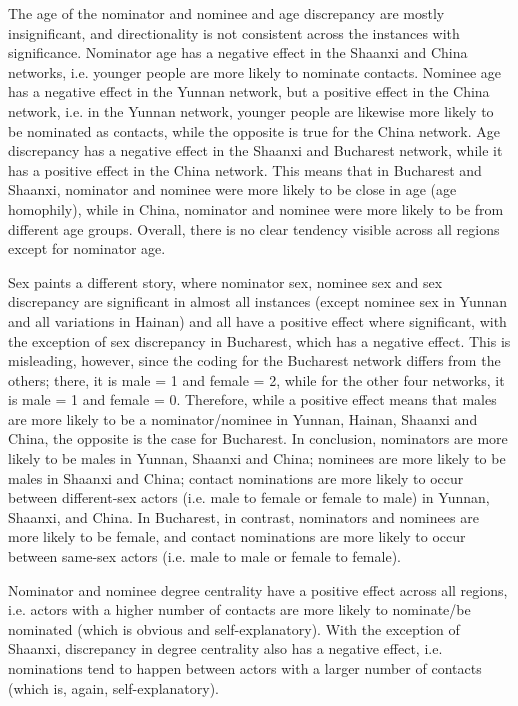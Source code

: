 The age of the nominator and nominee and age discrepancy are mostly insignificant, and directionality is not consistent across the instances with significance. Nominator age has a negative effect in the Shaanxi and China networks, i.e. younger people are more likely to nominate contacts. Nominee age has a negative effect in the Yunnan network, but a positive effect in the China network, i.e. in the Yunnan network, younger people are likewise more likely to be nominated as contacts, while the opposite is true for the China network. Age discrepancy has a negative effect in the Shaanxi and Bucharest network, while it has a positive effect in the China network. This means that in Bucharest and Shaanxi, nominator and nominee were more likely to be close in age (age homophily), while in China, nominator and nominee were more likely to be from different age groups. Overall, there is no clear tendency visible across all regions except for nominator age.

Sex paints a different story, where nominator sex, nominee sex and sex discrepancy are significant in almost all instances (except nominee sex in Yunnan and all variations in Hainan) and all have a positive effect where significant, with the exception of sex discrepancy in Bucharest, which has a negative effect. This is misleading, however, since the coding for the Bucharest network differs from the others; there, it is male = 1 and female = 2, while for the other four networks, it is male = 1 and female = 0. Therefore, while a positive effect means that males are more likely to be a nominator/nominee in Yunnan, Hainan, Shaanxi and China, the opposite is the case for Bucharest. In conclusion, nominators are more likely to be males in Yunnan, Shaanxi and China; nominees are more likely to be males in Shaanxi and China; contact nominations are more likely to occur between different-sex actors (i.e. male to female or female to male) in Yunnan, Shaanxi, and China. In Bucharest, in contrast, nominators and nominees are more likely to be female, and contact nominations are more likely to occur between same-sex actors (i.e. male to male or female to female).

Nominator and nominee degree centrality have a positive effect across all regions, i.e. actors with a higher number of contacts are more likely to nominate/be nominated (which is obvious and self-explanatory). With the exception of Shaanxi, discrepancy in degree centrality also has a negative effect, i.e. nominations tend to happen between actors with a larger number of contacts (which is, again, self-explanatory). 

